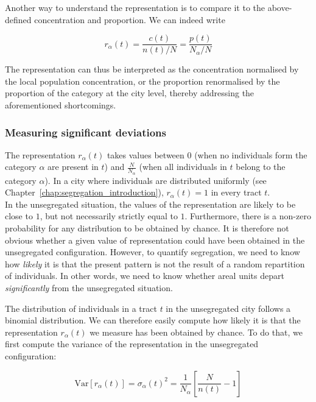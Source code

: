 Another way to understand the representation is to compare it to the
above-defined concentration and proportion. We can indeed write

\begin{equation}
    r_\alpha(t) = \frac{c(t)}{n(t) / N} = \frac{p(t)}{N_\alpha/N}
\end{equation}

The representation can thus be interpreted as the concentration
normalised by the local population concentration, or the proportion renormalised
by the proportion of the category at the city level, thereby addressing the
aforementioned shortcomings.\\


\subsubsection{Measuring significant deviations}
\label{ssub:measuring_significant_deviations}


The representation $r_\alpha(t)$ takes values between $0$ (when no
individuals form the category $\alpha$ are present in $t$) and
$\frac{N}{N_\alpha}$ (when all individuals in $t$ belong to the category
$\alpha$). In a city where individuals are distributed uniformly
(see Chapter~\ref{chap:segregation_introduction}), $r_\alpha(t) = 1$ in every
tract $t$.\\


In the unsegregated situation, the values of the representation are likely to be
close to $1$, but not necessarily strictly equal to $1$. Furthermore, there is a
non-zero probability for any distribution to be obtained by chance. It is
therefore not obvious whether a given value of representation could have been
obtained in the unsegregated configuration. However, to quantify segregation, we
need to know how \emph{likely} it is that the present pattern is not the result
of a random repartition of individuals.  In other words, we need to know
whether areal units depart \emph{significantly} from the unsegregated situation. 

The distribution of individuals in a tract $t$ in the unsegregated city follows
a binomial distribution. We can therefore easily compute how likely it is that
the representation $r_\alpha(t)$ we measure has been obtained by chance. To do
that, we first compute the variance of the representation in the unsegregated
configuration:

\begin{equation}
    \mathrm{Var}\left[r_\alpha(t)\right] = \sigma_\alpha(t)^2 = \frac{1}{N_\alpha} \left[\frac{N}{n(t)} - 1\right]
\end{equation}

